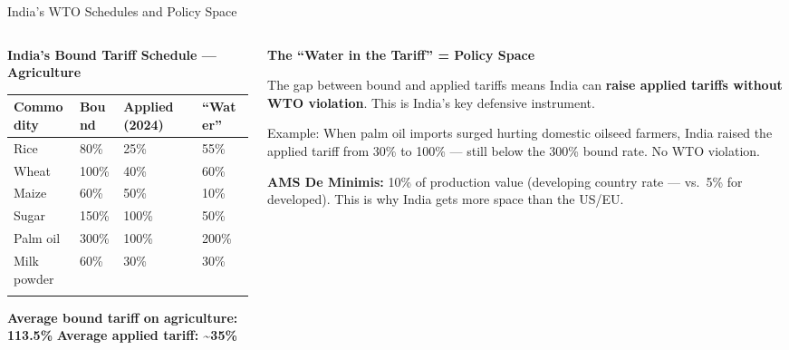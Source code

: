 \documentclass[
  ignorenonframetext,
  aspectratio=169,
]{beamer}
\makeatletter
\let\quarto@originallabel\label
\DeclareRobustCommand*{\label}[1]{\quarto@originallabel{#1}}
\makeatother
\begin{document}
\begin{frame}{India's WTO Schedules and Policy Space}
\label{indias-wto-schedules-and-policy-space}
\begin{columns}[T]
\begin{column}{0.5\linewidth}
\textbf{India's Bound Tariff Schedule --- Agriculture}

\begin{longtable}[]{@{}llll@{}}
\toprule\noalign{}
Commodity & Bound & Applied (2024) & ``Water'' \\
\midrule\noalign{}
\endhead
Rice & 80\% & 25\% & 55\% \\
Wheat & 100\% & 40\% & 60\% \\
Maize & 60\% & 50\% & 10\% \\
Sugar & 150\% & 100\% & 50\% \\
Palm oil & 300\% & 100\% & 200\% \\
Milk powder & 60\% & 30\% & 30\% \\
\bottomrule\noalign{}
\end{longtable}

\textbf{Average bound tariff on agriculture: 113.5\%} \textbf{Average
applied tariff: \textasciitilde35\%}
\end{column}

\begin{column}{0.5\linewidth}
\textbf{The ``Water in the Tariff'' = Policy Space}

The gap between bound and applied tariffs means India can \textbf{raise
applied tariffs without WTO violation}. This is India's key defensive
instrument.

Example: When palm oil imports surged hurting domestic oilseed farmers,
India raised the applied tariff from 30\% to 100\% --- still below the
300\% bound rate. No WTO violation.

\textbf{AMS De Minimis:} 10\% of production value (developing country
rate --- vs.~5\% for developed). This is why India gets more space than
the US/EU.
\end{column}
\end{columns}
\end{frame}
\end{document}
